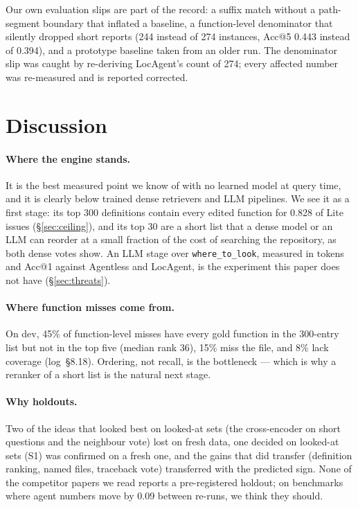 \documentclass[10pt,twocolumn]{article}
\makeatletter
\newcommand{\accat}[1]{Acc@#1}
\makeatother
\begin{document}
Our own evaluation slips are part of the record: a suffix match without a path-segment boundary that
inflated a baseline, a function-level denominator that silently dropped short reports (244 instead
of 274 instances, \accat{5} 0.443 instead of 0.394), and a prototype baseline taken from an older
run. The denominator slip was caught by re-deriving LocAgent's count of 274; every affected number
was re-measured and is reported corrected.

\section{Discussion}
\label{sec:discussion}

\paragraph{Where the engine stands.}
It is the best measured point we know of with no learned model at query time, and it is clearly
below trained dense retrievers and LLM pipelines. We see it as a first stage: its top 300
definitions contain every edited function for 0.828 of Lite issues (\S\ref{sec:ceiling}), and its
top 30 are a short list that a dense model or an LLM can reorder at a small fraction of the cost of
searching the repository, as both dense votes show. An LLM stage over \texttt{where\_to\_look},
measured in tokens and \accat{1} against Agentless and LocAgent, is the experiment this paper does
not have (\S\ref{sec:threats}).

\paragraph{Where function misses come from.}
On dev, 45\% of function-level misses have every gold function in the 300-entry list but not in the
top five (median rank 36), 15\% miss the file, and 8\% lack coverage (log~\S8.18). Ordering, not
recall, is the bottleneck --- which is why a reranker of a short list is the natural next stage.

\paragraph{Why holdouts.}
Two of the ideas that looked best on looked-at sets (the cross-encoder on short questions and the
neighbour vote) lost on fresh data, one decided on looked-at sets (S1) was confirmed on a fresh one,
and the gains that did transfer (definition ranking, named files, traceback vote) transferred with
the predicted sign. None of the competitor papers we read reports a pre-registered holdout; on
benchmarks where agent numbers move by 0.09 between re-runs, we think they should.
\end{document}
